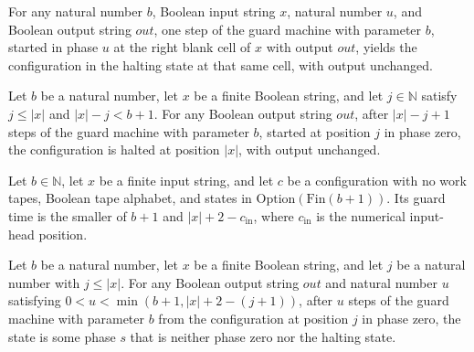 \begin{lemma}
\label{Turing.MachineFormat.guardBlock_blank}
\leanok
{}
For any natural number $b$, Boolean input string $x$, natural number $u$, and Boolean
output string $out$, one step of the guard machine with parameter $b$, started in phase
$u$ at the right blank cell of $x$ with output $out$, yields the configuration in the
halting state at that same cell, with output unchanged.
\end{lemma}

\begin{lemma}
\label{Turing.MachineFormat.guardBlock_short}
\leanok
{}
Let $b$ be a natural number, let $x$ be a finite Boolean string, and let $j\in\mathbb N$
satisfy $j\le |x|$ and $|x|-j<b+1$. For any Boolean output string $out$, after $|x|-j+1$
steps of the guard machine with parameter $b$, started at position $j$ in phase zero,
the configuration is halted at position $|x|$, with output unchanged.
\end{lemma}

\begin{definition}
\label{Turing.MachineFormat.guardTime}
\leanok
{}
Let $b\in\mathbb{N}$, let $x$ be a finite input string, and let $c$ be a configuration
with no work tapes, Boolean tape alphabet, and states in
$\mathrm{Option}(\mathrm{Fin}(b+1))$. Its guard time is the smaller of $b+1$ and
$|x|+2-c_{\mathrm{in}}$, where $c_{\mathrm{in}}$ is the numerical input-head position.
\end{definition}

\begin{lemma}
\label{Turing.MachineFormat.guardBlock_interior}
\leanok
{}
Let $b$ be a natural number, let $x$ be a finite Boolean string, and let $j$ be a
natural number with $j\le |x|$. For any Boolean output string $out$ and natural number
$u$ satisfying $0<u<\min(b+1,|x|+2-(j+1))$, after $u$ steps of the guard machine with
parameter $b$ from the configuration at position $j$ in phase zero, the state is some
phase $s$ that is neither phase zero nor the halting state.
\end{lemma}

